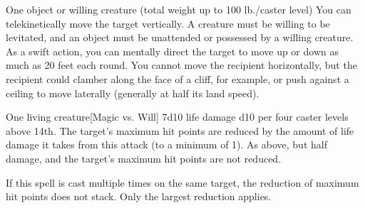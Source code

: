 \begin{spellheader}
    \spellrng{\rngclose}
    \spelldur{\durshort \dismissable}
\end{spellheader}
\begin{spelleffects}
    \begin{spelltarget}{One object or willing creature (total weight up to 100 lb./caster level)}
        \spelleffect You can telekinetically move the target vertically. A creature must be willing to be levitated, and an object must be unattended or possessed by a willing creature. As a swift action, you can mentally direct the target to move up or down as much as 20 feet each round. You cannot move the recipient horizontally, but the recipient could clamber along the face of a cliff, for example, or push against a ceiling to move laterally (generally at half its land speed).
    \end{spelltarget}
\end{spelleffects}

\begin{spellheader}
    \spellrng{\rngmed}
\end{spellheader}
\begin{spelleffects}
    \begin{spelltarget}{One living creature}[Magic vs. Will]
        \spellsuccess 7d10 life damage \add d10 per four caster levels above 14th. The target's maximum hit points are reduced by the amount of life damage it takes from this attack (to a minimum of 1).
        \spellfailure As above, but half damage, and the target's maximum hit points are not reduced.
    \end{spelltarget}
\end{spelleffects}
\begin{spellfooter}
    \spellnotes If this spell is cast multiple times on the same target, the reduction of maximum hit points does not stack. Only the largest reduction applies.

    \cursespellnotes
\end{spellfooter}

